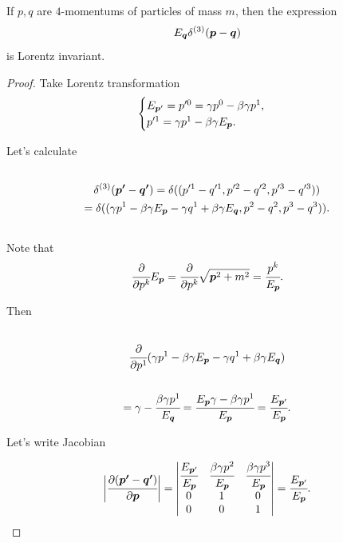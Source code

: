 \documentclass[main.tex]{subfiles}
\begin{document}
\begin{fact}
If $p, q$ are $4$-momentums of particles of mass $m$, then the expression
\begin{equation}
E_{\boldsymbol{q}}\delta^{(3)}(\boldsymbol{p} - \boldsymbol{q})
\end{equation}
is Lorentz invariant. 
\end{fact}
\begin{proof}
Take Lorentz transformation
\begin{equation}
\begin{cases}
E_{\boldsymbol{p}'} = p'^0 = \gamma p^0 - \beta\gamma p^1, \\
p'^1 = \gamma p^1 - \beta\gamma E_{\boldsymbol{p}}.
\end{cases}
\end{equation}

Let's calculate 
\begin{multline*}
\\
\delta^{(3)}(\boldsymbol{p'} - \boldsymbol{q'}) = \delta((p'^1 - q'^1, p'^2 - q'^2, p'^3 - q'^3))\\
= \delta((\gamma p^1 - \beta\gamma E_{\boldsymbol{p}} - \gamma q^1 + \beta\gamma E_{\boldsymbol{q}},p^2 - q^2, p^3 - q^3)).\\
\\
\end{multline*}
Note that
\begin{equation}
\cfrac{\partial}{\partial p^k} E_{\boldsymbol{p}} = \cfrac{\partial}{\partial p^k} \sqrt{\boldsymbol{p}^2 + m^2} =
\cfrac{p^k}{E_{\boldsymbol{p}}}.
\end{equation}

Then 
\begin{multline*}
\\
\cfrac{\partial}{\partial p^1}(\gamma p^1 - \beta\gamma E_{\boldsymbol{p}} - \gamma q^1 + \beta\gamma E_{\boldsymbol{q}})\\
\\ = \gamma - \cfrac{\beta\gamma p^1}{E_{\boldsymbol{q}}} = \cfrac{E_{\boldsymbol{p}}\gamma - \beta\gamma p^1}{E_{\boldsymbol{p}}} = \cfrac{E_{\boldsymbol{p}'}}{E_{\boldsymbol{p}}}.
\\ 
\end{multline*}

Let's write Jacobian

\begin{equation}
\bigg|\cfrac{\partial(\boldsymbol{p'} - \boldsymbol{q'})}{\partial \boldsymbol{p}} \bigg|=
\begin{vmatrix}
\cfrac{E_{\boldsymbol{p}'}}{E_{\boldsymbol{p}}} & \cfrac{\beta\gamma p^2}{E_{\boldsymbol{p}}} & \cfrac{\beta\gamma p^3} 
{E_{\boldsymbol{p}}} \\
0 & 1 & 0 \\
0 & 0 & 1
\end{vmatrix} = \cfrac{E_{\boldsymbol{p}'}}{E_{\boldsymbol{p}}}.
\end{equation}


\end{proof}
\end{document}
